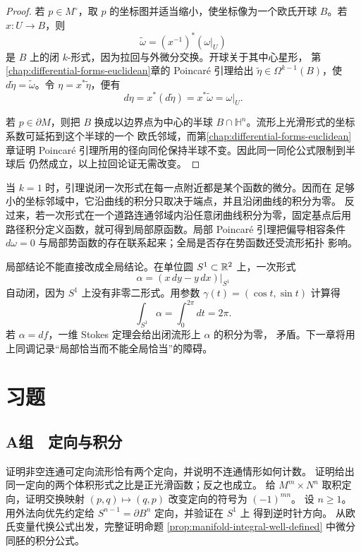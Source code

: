 \begin{proof}
若 $p\in M^\circ$，取 $p$ 的坐标图并适当缩小，使坐标像为一个欧氏开球
$B$。若 $x:U\to B$，则
\[
 \widetilde\omega=(x^{-1})^*(\omega|_U)
\]
是 $B$ 上的闭 $k$-形式，因为拉回与外微分交换。开球关于其中心星形，
第\ref{chap:differential-forms-euclidean}章的 Poincaré 引理给出
$\widetilde\eta\in\Omega^{k-1}(B)$，使
$d\widetilde\eta=\widetilde\omega$。令 $\eta=x^*\widetilde\eta$，便有
\[
 d\eta=x^*(d\widetilde\eta)
 =x^*\widetilde\omega=\omega|_U.
\]

若 $p\in\partial M$，则把 $B$ 换成以边界点为中心的半球
$B\cap\mathbb H^n$。流形上光滑形式的坐标系数可延拓到这个半球的一个
欧氏邻域，而第\ref{chap:differential-forms-euclidean}章证明
Poincaré 引理所用的径向同伦保持半球不变。因此同一同伦公式限制到半球后
仍然成立，以上拉回论证无需改变。
\end{proof}

当 \(k=1\) 时，引理说闭一次形式在每一点附近都是某个函数的微分。因而在
足够小的坐标邻域中，它沿曲线的积分只取决于端点，并且沿闭曲线的积分为零。
反过来，若一次形式在一个道路连通邻域内沿任意闭曲线积分为零，固定基点后用
路径积分定义函数，就可得到局部原函数。局部 Poincaré 引理把偏导相容条件
\(d\omega=0\) 与局部势函数的存在联系起来；全局是否存在势函数还受流形拓扑
影响。

局部结论不能直接改成全局结论。在单位圆 $S^1\subset\mathbb{R}^2$ 上，一次形式
\[
 \alpha=(x\,dy-y\,dx)|_{S^1}
\]
自动闭，因为 $S^1$ 上没有非零二形式。用参数
$\gamma(t)=(\cos t,\sin t)$ 计算得
\[
 \int_{S^1}\alpha=\int_0^{2\pi}dt=2\pi.
\]
若 $\alpha=df$，一维 Stokes 定理会给出闭流形上 $\alpha$ 的积分为零，
矛盾。下一章将用上同调记录“局部恰当而不能全局恰当”的障碍。

\section*{习题}

\subsection*{A组　定向与积分}
\begin{enumerate}[label=\textbf{\thechapter.\arabic*.}]
 证明非空连通可定向流形恰有两个定向，并说明不连通情形如何计数。
 证明给出同一定向的两个体积形式之比是正光滑函数；反之也成立。
 给 $M^m\times N^n$ 取积定向，证明交换映射
 $(p,q)\mapsto(q,p)$ 改变定向的符号为 $(-1)^{mn}$。
 设 $n\ge1$。用外法向优先约定给 $S^{n-1}=\partial B^n$ 定向，并验证在 $S^1$ 上
 得到逆时针方向。
 从欧氏变量代换公式出发，完整证明命题
 \ref{prop:manifold-integral-well-defined} 中微分同胚的积分公式。
\end{enumerate}

